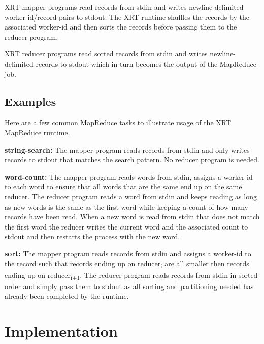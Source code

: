 \documentclass[twocolumn,11px]{article}       %
\begin{document}
XRT mapper programs read records from stdin and writes newline-delimited worker-id/record pairs to stdout.
The XRT runtime shuffles the records by the associated worker-id and then sorts the records before passing them to the reducer program.

XRT reducer programs read sorted records from stdin and writes newline-delimited records to stdout which in turn becomes the output of the MapReduce job.

\subsection{Examples} \label{sec:examples}

Here are a few common MapReduce tasks to illustrate usage of the XRT MapReduce runtime.

\bigskip
\noindent
\textbf{string-search:} The mapper program reads records from stdin and only writes records to stdout that matches the search pattern. No reducer program is needed.

\bigskip
\noindent
\textbf{word-count:} The mapper program reads words from stdin, assigns a worker-id to each word to ensure that all words that are the same end up on the same reducer.
The reducer program reads a word from stdin and keeps reading as long as new words is the same as the first word while keeping a count of how many records have been read.
When a new word is read from stdin that does not match the first word the reducer writes the current word and the associated count to stdout and then restarts the process with the new word.

\bigskip
\noindent
\textbf{sort:} The mapper program reads records from stdin and assigns a worker-id to the record such that records ending up on reducer\textsubscript{i} are all smaller then records ending up on reducer\textsubscript{i+1}.
The reducer program reads records from stdin in sorted order and simply pass them to stdout as all sorting and partitioning needed has already been completed by the runtime.

\section{Implementation} \label{sec:impl}
\end{document}
